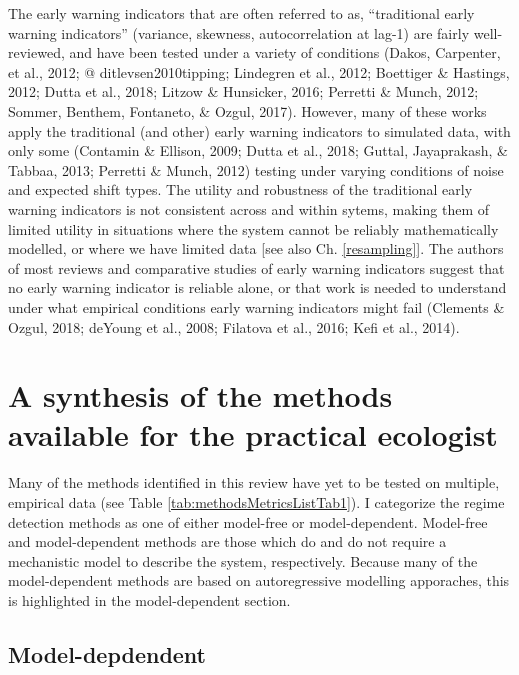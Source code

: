\documentclass[12pt,twoside,openany]{reedthesis}
\begin{document}
The early warning indicators that are often referred to as, ``traditional early warning indicators'' (variance, skewness, autocorrelation at lag-1) are fairly well-reviewed, and have been tested under a variety of conditions (Dakos, Carpenter, et al., 2012; @ ditlevsen2010tipping; Lindegren et al., 2012; Boettiger \& Hastings, 2012; Dutta et al., 2018; Litzow \& Hunsicker, 2016; Perretti \& Munch, 2012; Sommer, Benthem, Fontaneto, \& Ozgul, 2017). However, many of these works apply the traditional (and other) early warning indicators to simulated data, with only some (Contamin \& Ellison, 2009; Dutta et al., 2018; Guttal, Jayaprakash, \& Tabbaa, 2013; Perretti \& Munch, 2012) testing under varying conditions of noise and expected shift types. The utility and robustness of the traditional early warning indicators is not consistent across and within sytems, making them of limited utility in situations where the system cannot be reliably mathematically modelled, or where we have limited data {[}see also Ch. \ref{resampling}{]}. The authors of most reviews and comparative studies of early warning indicators suggest that no early warning indicator is reliable alone, or that work is needed to understand under what empirical conditions early warning indicators might fail (Clements \& Ozgul, 2018; deYoung et al., 2008; Filatova et al., 2016; Kefi et al., 2014).

\hypertarget{a-synthesis-of-the-methods-available-for-the-practical-ecologist}{%
\section{A synthesis of the methods available for the practical ecologist}\label{a-synthesis-of-the-methods-available-for-the-practical-ecologist}}

Many of the methods identified in this review have yet to be tested on multiple, empirical data (see Table \ref{tab:methodsMetricsListTab1}). I categorize the regime detection methods as one of either model-free or model-dependent. Model-free and model-dependent methods are those which do and do not require a mechanistic model to describe the system, respectively. Because many of the model-dependent methods are based on autoregressive modelling apporaches, this is highlighted in the model-dependent section.

\hypertarget{model-depdendent}{%
\subsection{Model-depdendent}\label{model-depdendent}}
\end{document}
